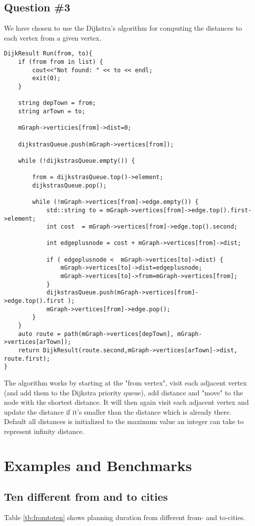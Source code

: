\subsection{Question \#3}
We have chosen to use the Dijkstra's algorithm for computing the distances to each vertex from a given vertex.
\bigskip
\begin{lstlisting}
DijkResult Run(from, to){
	if (from from in list) {
		cout<<"Not found: " << to << endl;
		exit(0);
	}

	string depTown = from;
	string arTown = to;

	mGraph->verticies[from]->dist=0;

	dijkstrasQueue.push(mGraph->vertices[from]);

	while (!dijkstrasQueue.empty()) {

		from = dijkstrasQueue.top()->element;
		dijkstrasQueue.pop();

		while (!mGraph->vertices[from]->edge.empty()) {
			std::string to = mGraph->vertices[from]->edge.top().first->element;
			int cost  = mGraph->vertices[from]->edge.top().second;

			int edgeplusnode = cost + mGraph->vertices[from]->dist;

			if ( edgeplusnode <  mGraph->vertices[to]->dist) {
				mGraph->vertices[to]->dist=edgeplusnode;
				mGraph->vertices[to]->from=mGraph->vertices[from];
			}
			dijkstrasQueue.push(mGraph->vertices[from]->edge.top().first );
			mGraph->vertices[from]->edge.pop();
		}
	}
	auto route = path(mGraph->vertices[depTown], mGraph->vertices[arTown]);
	return DijkResult(route.second,mGraph->vertices[arTown]->dist, route.first);
}
\end{lstlisting}
\bigskip
The algorithm works by starting at the "from vertex", visit each adjacent vertex (and add them to the Dijkstra priority queue), add distance and "move" to the node with the shortest distance. 
It will then again visit each adjacent vertex and update the distance if it's smaller than the distance which is already there.
Default all distances is initialized to the maximum value an integer can take to represent infinity distance.


\section{Examples and Benchmarks}
\subsection{Ten different from and to cities}
Table \ref{tb:fromtoten} shows planning duration from different from- and to-cities.

